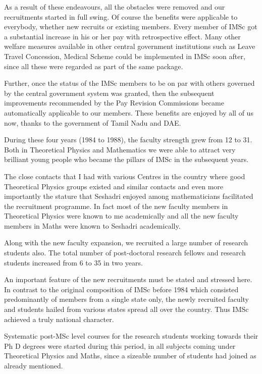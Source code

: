 \vspace{.1cm}

As a result of these endeavours, all the obstacles were removed and our 
recruitments started in full swing. Of course the benefits were 
applicable to everybody, whether new recruits or existing members. Every 
member of IMSc got a substantial increase in his or her pay with 
retrospective effect. Many other welfare measures available in other 
central government institutions such as Leave Travel Concession, Medical 
Scheme could be implemented in IMSc soon after, since all these were 
regarded as part of the same package.

Further, once the status of the IMSc members to be on par with others 
governed by the central government system was granted, then the 
subsequent improvements recommended by the Pay Revision Commissions 
became automatically applicable to our members. These benefits are 
enjoyed by all of us now, thanks to the government of Tamil Nadu and 
DAE.


During these four years (1984 to 1988), the faculty strength grew from 
12 to 31. Both in Theoretical Physics and Mathema\-tics we were able to 
attract very brilliant young people who became the pillars of IMSc in 
the subsequent years.


The close contacts that I had with various Centres in the country where 
good Theoretical Physics groups existed and simi\-lar contacts and even 
more importantly the stature that Seshadri enjoyed among mathematicians 
facilitated the recruitment programme. In fact most of the new faculty 
members in Theoretical Physics were known to me academically and all the 
new faculty members in Maths were known to Seshadri academically.


Along with the new faculty expansion, we recruited a large number of 
research students also. The total number of post-doctoral research 
fellows and research students increased from 6 to 35 in two years.


An important feature of the new recruitments must be stated and stressed 
here. In contrast to the original composition of IMSc before 1984 which 
consisted predominantly of members from a single state only, the newly 
recruited faculty and stude\-nts hailed from various states spread all 
over the country. Thus IMSc achieved a truly national character.


Systematic post-MSc level courses for the research students working 
towards their Ph D degrees were started during this period, in all 
subjects coming under Theoretical Physics and Maths, since a sizeable 
number of students had joined as already mentioned.


